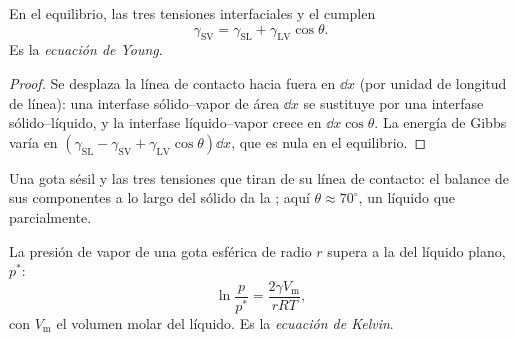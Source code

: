 \begin{theorem}\label{thm:b3:colloids:young}
En el equilibrio, las tres tensiones interfaciales y el  cumplen
\[
  \gamma_{\mathrm{SV}} = \gamma_{\mathrm{SL}} + \gamma_{\mathrm{LV}}\cos\theta .
\]
Es la \emph{ecuación de Young}.
\end{theorem}

\begin{proof}
Se desplaza la línea de contacto hacia fuera en $\dd x$ (por unidad de longitud de línea): una
interfase sólido--vapor de área $\dd x$ se sustituye por una interfase sólido--líquido, y la
interfase líquido--vapor crece en $\dd x\cos\theta$. La energía de Gibbs varía en
$(\gamma_{\mathrm{SL}} - \gamma_{\mathrm{SV}} + \gamma_{\mathrm{LV}}\cos\theta)\dd x$, que es nula en el equilibrio.
\end{proof}

\begin{omfigure}

{\small Una gota sésil y las tres tensiones que tiran de su línea de contacto: el
balance de sus componentes a lo largo del sólido da la ; aquí $\theta
\approx 70^\circ$, un líquido que  parcialmente.}
\end{omfigure}

\begin{theorem}\label{thm:b3:colloids:kelvin}
La presión de vapor de una gota esférica de radio $r$ supera a la del líquido
plano, $p^*$:
\[
  \ln\frac{p}{p^*} = \frac{2\gamma V_{\mathrm m}}{rRT},
\]
con $V_{\mathrm m}$ el volumen molar del líquido. Es la \emph{ecuación de
Kelvin}.
\end{theorem}


